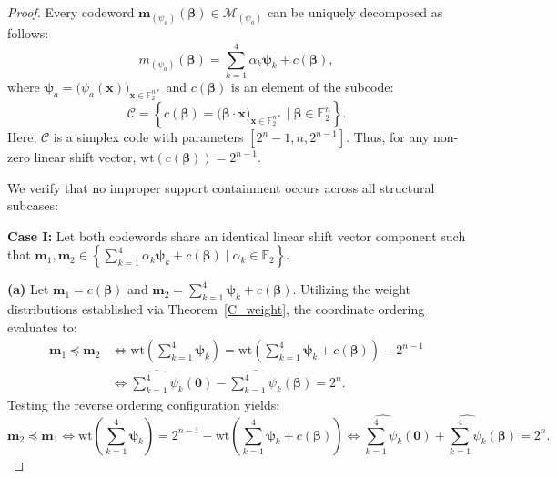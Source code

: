 \documentclass[pdflatex,sn-mathphys-num]{sn-jnl}%
\theoremstyle{thmstyleone}%
\theoremstyle{thmstyletwo}%
\theoremstyle{thmstylethree}%
\begin{document}
\begin{proof}
Every codeword $\mathbf{m}_{(\psi_a)}(\mathbf{\beta}) \in \mathcal{M}_{(\psi_a)}$ can be uniquely decomposed as follows:
\[
m_{(\psi_a)}(\mathbf{\beta})=\sum_{k=1}^{4}\alpha_k \mathbf{\psi}_k + c(\mathbf{\beta}),
\]
where $\mathbf{\psi}_a = \bigl(\psi_a(\mathbf{x})\bigr)_{\mathbf{x} \in \mathbb{F}_2^{n*}}$ and $c(\mathbf{\beta})$ is an element of the subcode:
\[
\mathcal{C}=\left\{c(\mathbf{\beta})=\bigl(\mathbf{\beta}\cdot \mathbf{x}\bigr)_{\mathbf{x} \in \mathbb{F}_2^{n*}} \mid \mathbf{\beta}\in \mathbb{F}_2^n\right\}.
\]
Here, $\mathcal{C}$ is a simplex code with parameters $[2^n - 1, n, 2^{n-1}]$. Thus, for any non-zero linear shift vector, $\mathrm{wt}(c(\mathbf{\beta})) = 2^{n-1}$. 

We verify that no improper support containment occurs across all structural subcases:

\textbf{Case I:} Let both codewords share an identical linear shift vector component such that $\mathbf{m}_1, \mathbf{m}_2 \in \left\{\sum_{k=1}^{4} \alpha_k \mathbf{\psi}_k + c(\mathbf{\beta}) \mid \alpha_k \in \mathbb{F}_2 \right\}$. 

\textbf{(a)} Let $\mathbf{m}_1 = c(\mathbf{\beta})$ and $\mathbf{m}_2 = \sum_{k=1}^{4} \mathbf{\psi}_k + c(\mathbf{\beta})$. Utilizing the weight distributions established via Theorem~\ref{C_weight}, the coordinate ordering evaluates to:
\begin{align*}
\mathbf{m}_1 \preceq \mathbf{m}_2 &\Leftrightarrow 
\mathrm{wt}\!\left(\sum_{k=1}^{4} \mathbf{\psi}_k\right) 
= \mathrm{wt}\!\left(\sum_{k=1}^{4} \mathbf{\psi}_k + c(\mathbf{\beta})\right) - 2^{n-1}\\
& \Leftrightarrow \widehat{\sum_{k=1}^{4} \psi_k}(\mathbf{0}) - \widehat{\sum_{k=1}^{4} \psi_k}(\mathbf{\beta}) = 2^n.
\end{align*}
Testing the reverse ordering configuration yields:
\[
\mathbf{m}_2 \preceq \mathbf{m}_1 \Leftrightarrow 
\mathrm{wt}\!\left(\sum_{k=1}^{4} \mathbf{\psi}_k\right) 
= 2^{n-1} - \mathrm{wt}\!\left(\sum_{k=1}^{4} \mathbf{\psi}_k + c(\mathbf{\beta})\right)
\Leftrightarrow \widehat{\sum_{k=1}^{4} \psi_k}(\mathbf{0}) + \widehat{\sum_{k=1}^{4} \psi_k}(\mathbf{\beta}) = 2^n.
\]


\end{proof}
\end{document}
